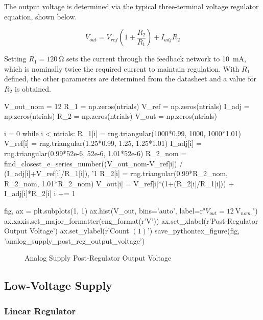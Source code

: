 \documentclass[12pt, titlepage]{tex-template}
\begin{document}
The output voltage is determined via the typical three-terminal voltage regulator equation, shown below.

$$ V_{out} = V_{ref}\left(1+\frac{R_2}{R_1}\right) + I_{adj}R_2 $$

Setting $R_1=\SI{120}{\ohm}$ sets the current through the feedback network to \SI{10}{\milli\ampere}, which is nominally twice the required current to maintain regulation. With $R_1$ defined, the other parameters are determined from the datasheet and a value for $R_2$ is obtained.

\begin{pycode}
V_out_nom = 12
R_1 = np.zeros(ntrials)
V_ref = np.zeros(ntrials)
I_adj = np.zeros(ntrials)
R_2 = np.zeros(ntrials)
V_out = np.zeros(ntrials)

i = 0
while i < ntrials: 
    R_1[i] = rng.triangular(1000*0.99, 1000, 1000*1.01)
    V_ref[i] = rng.triangular(1.25*0.99, 1.25, 1.25*1.01)
    I_adj[i] = rng.triangular(0.99*52e-6, 52e-6, 1.01*52e-6)
    R_2_nom = find_closest_e_series_number((V_out_nom-V_ref[i]) / (I_adj[i]+V_ref[i]/R_1[i]), '1%
    R_2[i] = rng.triangular(0.99*R_2_nom, R_2_nom, 1.01*R_2_nom)
    V_out[i] = V_ref[i]*(1+(R_2[i]/R_1[i])) + I_adj[i]*R_2[i]
    i += 1

fig, ax = plt.subplots(1, 1)
ax.hist(V_out, bins='auto', label=r"$V_{out}=\SI{12}{\volt}_{nom.}$")
ax.xaxis.set_major_formatter(eng_format(r'\unit{\volt}'))
ax.set_xlabel(r'Post-Regulator Output Voltage')
ax.set_ylabel(r'Count $\left(1\right)$')
save_pythontex_figure(fig, 'analog_supply_post_reg_output_voltage')
\end{pycode}

\begin{figure}[!ht]
    \centering
    
    \caption{Analog Supply Post-Regulator Output Voltage}
\end{figure}

\subsection{Low-Voltage Supply}
\subsubsection{Linear Regulator}
\end{document}
